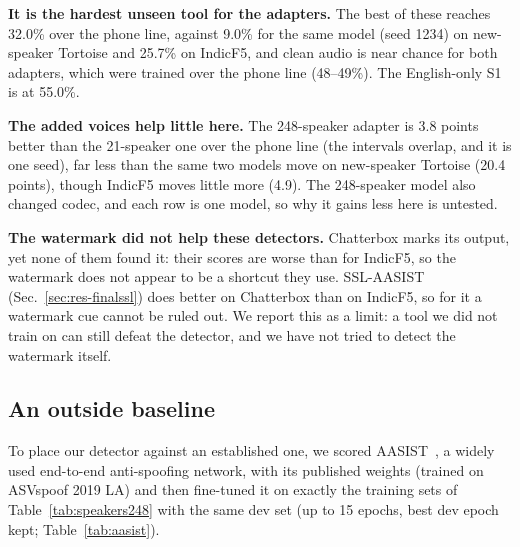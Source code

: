\textbf{It is the hardest unseen tool for the adapters.} The best of these reaches 32.0\% over the phone
line, against 9.0\% for the same model (seed 1234) on new-speaker Tortoise and 25.7\% on IndicF5, and
clean audio is near chance for both adapters, which were trained over the phone line
(48--49\%). The English-only S1 is at 55.0\%.

\textbf{The added voices help little here.} The 248-speaker adapter is 3.8 points better
than the 21-speaker one over the phone line (the intervals overlap, and it is one seed), far
less than the same two models move on new-speaker Tortoise (20.4 points), though IndicF5
moves little more (4.9). The 248-speaker model also changed codec, and each row is one model, so why it
gains less here is untested.

\textbf{The watermark did not help these detectors.} Chatterbox marks its output, yet none
of them found it: their scores are worse than for IndicF5, so the watermark does not appear
to be a shortcut they use. SSL-AASIST (Sec.~\ref{sec:res-finalssl}) does better on
Chatterbox than on IndicF5, so for it a watermark cue cannot be ruled out. We report this as a limit: a tool we did not train on can still defeat the detector,
and we have not tried to detect the watermark itself.

\subsection{An outside baseline}
\label{sec:res-aasist}

To place our detector against an established one, we scored AASIST~\cite{jung2022aasist},
a widely used end-to-end anti-spoofing network, with its published weights
(trained on ASVspoof 2019 LA) and then fine-tuned it on exactly the training sets of
Table~\ref{tab:speakers248} with the same dev set (up to 15 epochs, best dev epoch kept;
Table~\ref{tab:aasist}).

